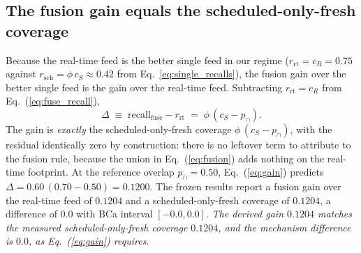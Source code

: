 \documentclass[journal]{IEEEtran}
\begin{document}
\subsection{The fusion gain equals the scheduled-only-fresh coverage}
Because the real-time feed is the better single feed in our regime ($r_{\mathrm{rt}} = c_R = 0.75$
against $r_{\mathrm{sch}} = \phi\,c_S \approx 0.42$ from Eq.~\ref{eq:single_recalls}), the fusion
gain over the better single feed is the gain over the real-time feed. Subtracting
$r_{\mathrm{rt}} = c_R$ from Eq.~(\ref{eq:fuse_recall}),
\begin{equation}
\Delta \;\equiv\; \mathrm{recall}_{\text{fuse}} - r_{\mathrm{rt}}
\;=\; \phi\,(c_S - p_{\cap}).
\label{eq:gain}
\end{equation}
The gain is \emph{exactly} the scheduled-only-fresh coverage $\phi\,(c_S - p_{\cap})$, with the
residual identically zero by construction: there is no leftover term to attribute to the fusion
rule, because the union in Eq.~(\ref{eq:fusion}) adds nothing on the real-time footprint. At the
reference overlap $p_{\cap} = 0.50$, Eq.~(\ref{eq:gain}) predicts
$\Delta = 0.60\,(0.70 - 0.50) = 0.1200$. The frozen results report a fusion gain over the
real-time feed of $0.1204$ and a scheduled-only-fresh coverage of $0.1204$, a difference of $0.0$
with BCa interval $[-0.0, 0.0]$. \emph{The derived gain $0.1204$ matches the measured
scheduled-only-fresh coverage $0.1204$, and the mechanism difference is $0.0$, as Eq.~(\ref{eq:gain})
requires.}
\end{document}
